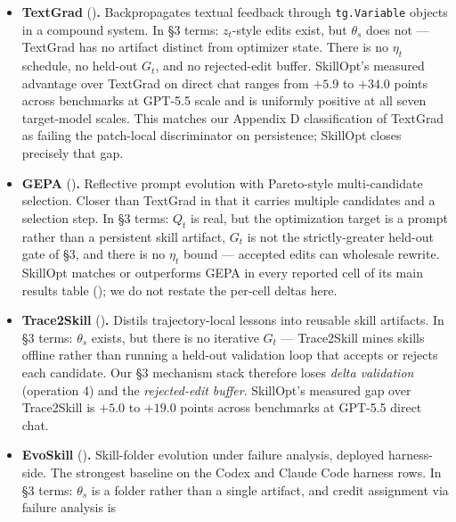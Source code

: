 \documentclass[
]{article}
\begin{document}
\begin{itemize}
\item
  \textbf{TextGrad} ()\textbf{.} Backpropagates textual feedback through
  \texttt{tg.Variable} objects in a compound system. In §3 terms:
  \(z_t\)-style edits exist, but \(\theta_s\) does not --- TextGrad has
  no artifact distinct from optimizer state. There is no \(\eta_t\)
  schedule, no held-out \(G_t\), and no rejected-edit buffer. SkillOpt's
  measured advantage over TextGrad on direct chat ranges from \(+5.9\)
  to \(+34.0\) points across benchmarks at GPT-5.5 scale and is
  uniformly positive at all seven target-model scales. This matches our
  Appendix D classification of TextGrad as failing the patch-local
  discriminator on persistence; SkillOpt closes precisely that gap.
\item
  \textbf{GEPA} ()\textbf{.} Reflective prompt evolution with Pareto-style
  multi-candidate selection. Closer than TextGrad in that it carries
  multiple candidates and a selection step. In §3 terms: \(Q_t\) is
  real, but the optimization target is a prompt rather than a persistent
  skill artifact, \(G_t\) is not the strictly-greater held-out gate of
  §3, and there is no \(\eta_t\) bound --- accepted edits can wholesale
  rewrite. SkillOpt matches or outperforms GEPA in every reported cell
  of its main results table (); we do not restate the per-cell deltas here.
\item
  \textbf{Trace2Skill} ()\textbf{.} Distils trajectory-local lessons into reusable skill
  artifacts. In §3 terms: \(\theta_s\) exists, but there is no iterative
  \(G_t\) --- Trace2Skill mines skills offline rather than running a
  held-out validation loop that accepts or rejects each candidate. Our
  §3 mechanism stack therefore loses \emph{delta validation} (operation
  4) and the \emph{rejected-edit buffer}. SkillOpt's measured gap over
  Trace2Skill is \(+5.0\) to \(+19.0\) points across benchmarks at
  GPT-5.5 direct chat.
\item
  \textbf{EvoSkill} ()\textbf{.} Skill-folder evolution under failure analysis,
  deployed harness-side. The strongest baseline on the Codex and Claude
  Code harness rows. In §3 terms: \(\theta_s\) is a folder rather than a
  single artifact, and credit assignment via failure analysis is

\end{itemize}
\end{document}
